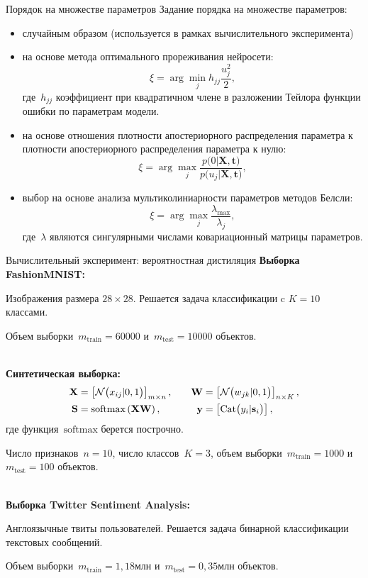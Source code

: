 \documentclass[10pt,pdf,hyperref={unicode}]{beamer}
\begin{document}
\begin{frame}{Порядок на множестве параметров}
Задание порядка на множестве параметров:
\begin{itemize}
	\item случайным образом (используется в рамках вычислительного эксперимента)
	\item на основе метода оптимального прореживания нейросети:
	\[
	\xi = \arg \min_{j} h_{jj}\frac{u_j^2}{2},
	\]
	где~$h_{jj}$ коэффициент при квадратичном члене в разложении Тейлора функции ошибки по параметрам модели.
	\item на основе отношения плотности апостериорного распределения параметра к плотности апостериорного распределения параметра к нулю:
	\[
	\xi = \arg \max_{j} \frac{p\bigr(0|\textbf{X}, \textbf{t}\bigr)}{p\bigr(u_j|\textbf{X}, \textbf{t}\bigr)},
	\]
	\item выбор на основе анализа мультиколиниарности параметров методов Белсли:
	\[
	\xi = \arg \max_{j} \frac{\lambda_{\max}}{\lambda_{j}}, 
	\]
	где~$\lambda$ являются сингулярными числами ковариационный матрицы параметров.
\end{itemize}
\end{frame}


\begin{frame}{Вычислительный эксперимент: вероятностная дистиляция}
\justifying
\textbf{Выборка FashionMNIST:}

Изображения размера $28\times 28$. Решается задача классификации c $K=10$ классами.

Объем выборки~$m_{\text{train}}=60000$ и~$m_{\text{test}}=10000$ объектов.

~\\
\textbf{Синтетическая выборка:}
\[
\setlength\abovedisplayskip{0pt}
\begin{aligned}
\textbf{X} &= \left[\mathcal{N}\bigr(x_{ij}|0, 1\bigr)\right]_{m\times n},  \quad &\textbf{W} &= \left[\mathcal{N}\bigr(w_{jk}|0, 1\bigr)\right]_{n\times K}, \\
 \textbf{S} &= \text{softmax}\left(\textbf{XW}\right), \quad &\textbf{y} &= \left[\text{Cat}\bigr(y_i| \textbf{s}_i\bigr)\right],
\end{aligned}
\setlength\belowdisplayskip{0pt}
\]
где функция~$\text{softmax}$ берется построчно.

Число признаков~$n=10$, число классов~$K=3$, объем выборки~$m_{\text{train}}=1000$ и~$m_{\text{test}}=100$ объектов. 

~\\
\textbf{Выборка Twitter Sentiment Analysis:}

Англоязычные твиты пользователей. Решается задача бинарной классификации текстовых сообщений.

Объем выборки~$m_{\text{train}}=1{,}18$млн и~$m_{\text{test}}=0{,}35$млн объектов.

\end{frame}
\end{document}
